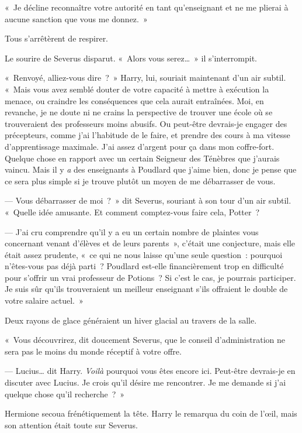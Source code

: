 «~Je décline reconnaître votre autorité en tant qu'enseignant et ne me plierai à aucune sanction que vous me donnez.~»

Tous s'arrêtèrent de respirer.

Le sourire de Severus disparut.
«~Alors vous serez…~»
il s'interrompit.

«~Renvoyé, alliez-vous dire~?~»
Harry, lui, souriait maintenant d'un air subtil.
«~Mais vous avez semblé douter de votre capacité à mettre à exécution la menace, ou craindre les conséquences que cela aurait entraînées.
Moi, en revanche, je ne doute ni ne crains la perspective de trouver une école où se trouveraient des professeurs moins abusifs.
Ou peut-être devrais-je engager des précepteurs, comme j'ai l'habitude de le faire, et prendre des cours à ma vitesse d'apprentissage maximale.
J'ai assez d'argent pour ça dans mon coffre-fort.
Quelque chose en rapport avec un certain Seigneur des Ténèbres que j'aurais vaincu.
Mais il y \emph{a} des enseignants à Poudlard que j'aime bien, donc je pense que ce sera plus simple si je trouve plutôt un moyen de me débarrasser de vous.

--- Vous débarrasser de moi~?~»
dit Severus, souriant à son tour d'un air subtil.
«~Quelle idée amusante.
Et comment comptez-vous faire cela, Potter~?

--- J'ai cru comprendre qu'il y a eu un certain nombre de plaintes vous concernant venant d'élèves et de leurs parents~», c'était une conjecture, mais elle était assez prudente, «~ce qui ne nous laisse qu'une seule question~: pourquoi n'êtes-vous pas déjà parti~?
Poudlard est-elle financièrement trop en difficulté pour s'offrir un vrai professeur de Potions~?
Si c'est le cas, je pourrais participer.
Je suis sûr qu'ils trouveraient un meilleur enseignant s'ils offraient le double de votre salaire actuel.~»

Deux rayons de glace généraient un hiver glacial au travers de la salle.

«~Vous découvrirez, dit doucement Severus, que le conseil d'administration ne sera pas le moins du monde réceptif à votre offre.

--- Lucius… dit Harry.
\emph{Voilà} pourquoi vous êtes encore ici.
Peut-être devrais-je en discuter avec Lucius.
Je crois qu'il désire me rencontrer.
Je me demande si j'ai quelque chose qu'il recherche~?~»

Hermione secoua frénétiquement la tête.
Harry le remarqua du coin de l'œil, mais son attention était toute sur Severus.

